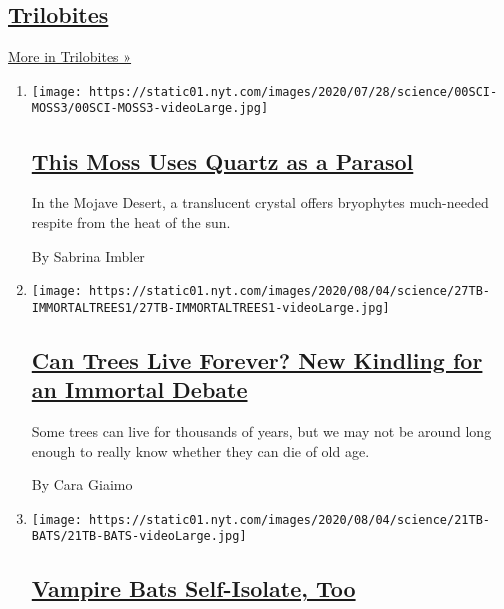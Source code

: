 \hypertarget{trilobites-3}{%
\subsection{\texorpdfstring{\href{/column/trilobites}{Trilobites}}{Trilobites}}\label{trilobites-3}}

\href{/column/trilobites}{More in Trilobites »}

\begin{enumerate}
\def\labelenumi{\arabic{enumi}.}
\item
  \texttt{[image: https://static01.nyt.com/images/2020/07/28/science/00SCI-MOSS3/00SCI-MOSS3-videoLarge.jpg]}

  \hypertarget{this-moss-uses-quartz-as-a-parasol}{%
  \subsection{\texorpdfstring{\href{/2020/07/29/science/moss-quartz-biology-syntrichia.html}{This
  Moss Uses Quartz as a
  Parasol}}{This Moss Uses Quartz as a Parasol}}\label{this-moss-uses-quartz-as-a-parasol}}

  In the Mojave Desert, a translucent crystal offers bryophytes
  much-needed respite from the heat of the sun.

  By Sabrina Imbler
\item
  \texttt{[image: https://static01.nyt.com/images/2020/08/04/science/27TB-IMMORTALTREES1/27TB-IMMORTALTREES1-videoLarge.jpg]}

  \hypertarget{can-trees-live-forever-new-kindling-for-an-immortal-debate}{%
  \subsection{\texorpdfstring{\href{/2020/07/27/science/trees-immortality.html}{Can
  Trees Live Forever? New Kindling for an Immortal
  Debate}}{Can Trees Live Forever? New Kindling for an Immortal Debate}}\label{can-trees-live-forever-new-kindling-for-an-immortal-debate}}

  Some trees can live for thousands of years, but we may not be around
  long enough to really know whether they can die of old age.

  By Cara Giaimo
\item
  \texttt{[image: https://static01.nyt.com/images/2020/08/04/science/21TB-BATS/21TB-BATS-videoLarge.jpg]}

  \hypertarget{vampire-bats-self-isolate-too}{%
  \subsection{\texorpdfstring{\href{/2020/07/22/science/vampire-bats-viruses.html}{Vampire
  Bats Self-Isolate,
  Too}}{Vampire Bats Self-Isolate, Too}}\label{vampire-bats-self-isolate-too}}


\end{enumerate}
